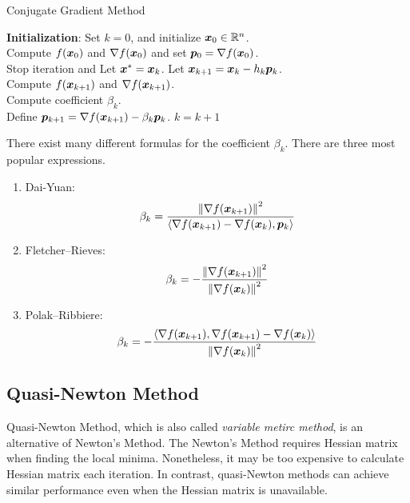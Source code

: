 \begin{algorithm}[!htbp]
    \caption{Conjugate Gradient Method}\label{alg:conjugate-grad}
    \textbf{Initialization}: Set \(k = 0\), and initialize \(\bm{x}_0 \in \mathbb{R}^n\). \\
    Compute \(f(\bm{x}_0)\) and \(\nabla f(\bm{x}_0)\) and set \(\bm{p}_0 = \nabla f(\bm{x}_0)\).\\
     {
         {
            Stop iteration and Let \(\bm{x}^* = \bm{x}_k\).
        }{
            Let \(\bm{x}_{k+1} = \bm{x}_k - h_k \bm{p}_k\). \\
            Compute \(f(\bm{x}_{k+1})\) and \(\nabla f(\bm{x}_{k+1})\). \\
            Compute coefficient \(\beta_k\). \\
            Define \(\bm{p}_{k+1} = \nabla f(\bm{x}_{k+1}) - \beta_k \bm{p}_k\).
        }
        \(k = k+1\)
    }
\end{algorithm}

There exist many different formulas for the coefficient \(\beta_k\). There are three most popular
expressions.
\begin{enumerate}
    \item {
        Dai-Yuan:
        \[
            \beta_k = \frac{\norm{\nabla f(\bm{x}_{k+1})}^2}
            {\left\langle \nabla f(\bm{x}_{k+1}) - \nabla f(\bm{x}_{k}),\bm{p}_k \right\rangle}  
        \]
    }
    \item {
        Fletcher–Rieves: 
        \[
            \beta_k = -\frac{\norm{\nabla f(\bm{x}_{k+1})}^2}{\norm{\nabla f(\bm{x}_{k})}^2}  
        \]
    }
    \item {
        Polak–Ribbiere:
        \[
            \beta_k = -\frac{\left\langle \nabla f(\bm{x}_{k+1}),\nabla f(\bm{x}_{k+1}) - \nabla f(\bm{x}_{k}) \right\rangle}{\norm{\nabla f(\bm{x}_{k})}^2}  
        \]
    }
\end{enumerate}

\subsection{Quasi-Newton Method}

Quasi-Newton Method, which is also called \emph{variable metirc method}, is an alternative of Newton's Method.
The Newton's Method requires Hessian matrix when finding the local minima. Nonetheless, it may be too expensive
to calculate Hessian matrix each iteration. In contrast, quasi-Newton methods can achieve similar performance
even when the Hessian matrix is unavailable.

